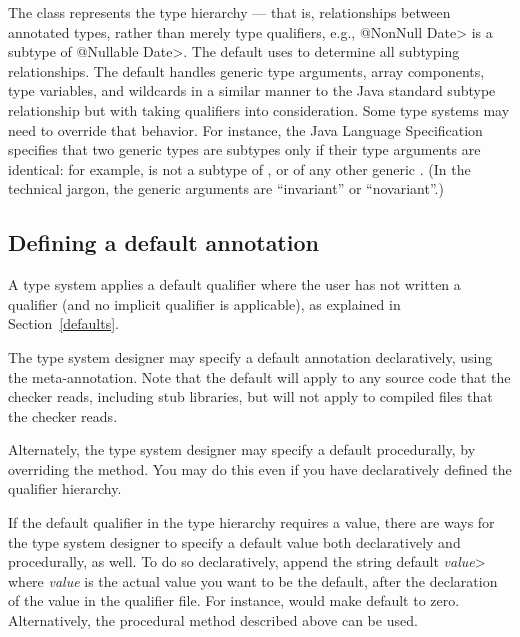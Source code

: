 The  class represents the type hierarchy ---
that is, relationships between
annotated types, rather than merely type qualifiers, e.g., \<@NonNull
Date> is a subtype of \<@Nullable Date>.  The default  uses
 to determine all subtyping relationships.
The default  handles
generic type arguments, array components, type variables, and
wildcards in a similar manner to the Java standard subtype
relationship but with taking qualifiers into consideration.  Some type
systems may need to override that behavior.  For instance, the Java
Language Specification specifies that two generic types are subtypes only
if their type arguments are identical:  for example,
 is not a subtype of , or of any other
generic .
(In the technical jargon, the generic arguments are ``invariant'' or ``novariant''.)


\subsection{Defining a default annotation\label{creating-typesystem-defaults}}

A type system applies a default qualifier where the user has not written a
qualifier (and no implicit qualifier is applicable), as explained in
Section~\ref{defaults}.

The type system designer may specify a default annotation declaratively,
using the 
meta-annotation.
Note that the default will apply to any source code that the checker reads,
including stub libraries, but will not apply to compiled 
files that the checker reads.

\begin{sloppypar}
Alternately, the type system designer may specify a default procedurally,
by overriding the
method.  You may do this even if you have declaratively defined the
qualifier hierarchy.
\end{sloppypar}

If the default qualifier in the type hierarchy requires a value, there are
ways for the type system designer to specify a default value both
declaratively and procedurally, as well.  To do so declaratively, append
the string \<default \emph{value}> where \emph{value} is the actual value
you want to be the default, after the declaration of the value in the
qualifier file.  For instance,  would make
 default to zero. Alternatively, the procedural method
described above can be used.


